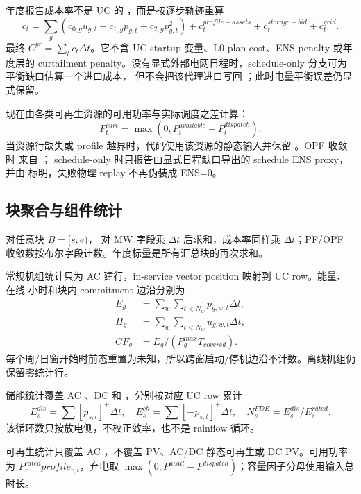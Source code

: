 年度报告成本率不是 UC 的 ，而是按逐步轨迹重算
\begin{equation}
 c_t=\sum_g(c_{0,g}u_{g,t}+c_{1,g}p_{g,t}+c_{2,g}p_{g,t}^2)
 +c_t^{profile-assets}+c_t^{storage-bid}+c_t^{grid}.
\end{equation}
最终 $C^{yr}=\sum_t c_t\Delta t$。它不含 UC startup 变量、L0 plan cost、ENS penalty 或年度层的
curtailment penalty。没有显式外部电网日程时，schedule-only 分支可为平衡缺口估算一个进口成本，
但不会把该代理进口写回 ；此时电量平衡误差仍显式保留。

 现在由各类可再生资源的可用功率与实际调度之差计算：
\begin{equation}
 P_t^{curt}=\max(0,P_t^{available}-P_t^{dispatch}).
\end{equation}
当资源行缺失或 profile 越界时，代码使用该资源的静态输入并保留
。OPF 收敛时  来自 ；
schedule-only 时只报告由显式日程缺口导出的 schedule ENS proxy，并由
 标明，失败物理 replay 不再伪装成 ENS=0。

\subsection{块聚合与组件统计}
对任意块 $B=[s,e)$， 对 MW 字段乘 $\Delta t$ 后求和，成本率同样乘
$\Delta t$；PF/OPF 收敛数按布尔字段计数。年度标量是所有汇总块的再次求和。

常规机组统计只为 AC  建行，in-service vector position 映射到 UC row。能量、在线
小时和块内 commitment 边沿分别为
\begin{align}
 E_g&=\sum_w\sum_{t<N_w}p_{g,w,t}\Delta t,\\
 H_g&=\sum_w\sum_{t<N_w}u_{g,w,t}\Delta t,\\
 CF_g&=E_g/(P_g^{max}T_{covered}).
\end{align}
每个周/日窗开始时前态重置为未知，所以跨窗启动/停机边沿不计数。离线机组仍保留零统计行。

储能统计覆盖 AC 、DC  和 ，分别按对应 UC row 累计
\begin{equation}
 E_s^{dis}=\sum[p_{s,t}]^+\Delta t,\quad
 E_s^{ch}=\sum[-p_{s,t}]^+\Delta t,\quad
 N_s^{FDE}=E_s^{dis}/E_s^{rated}.
\end{equation}
该循环数只按放电侧，不校正效率，也不是 rainflow 循环。

可再生统计只覆盖 AC ，不覆盖 PV、AC/DC 静态可再生或 DC PV。可用功率为
$P_r^{rated}profile_{r,t}$，弃电取 $\max(0,P^{avail}-P^{dispatch})$；容量因子分母使用输入总时长。

